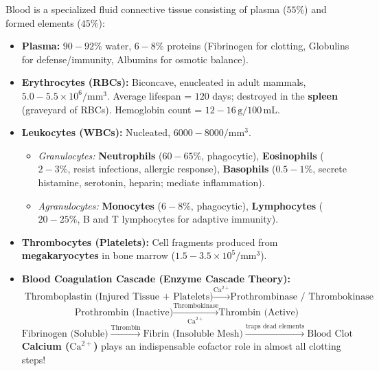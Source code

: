 \documentclass[10pt,a4paper]{article}
\begin{document}
\begin{conceptbox}
Blood is a specialized fluid connective tissue consisting of plasma ($55\%$) and formed elements ($45\%$):
\begin{itemize}
  \item \textbf{Plasma:} $90-92\%$ water, $6-8\%$ proteins (Fibrinogen for clotting, Globulins for defense/immunity, Albumins for osmotic balance).
  \item \textbf{Erythrocytes (RBCs):} Biconcave, enucleated in adult mammals, $5.0-5.5 \times 10^6/\mathrm{mm}^3$. Average lifespan = $120$ days; destroyed in the \textbf{spleen} (graveyard of RBCs). Hemoglobin count = $12-16\,\mathrm{g}/100\,\mathrm{mL}$.
  \item \textbf{Leukocytes (WBCs):} Nucleated, $6000-8000/\mathrm{mm}^3$.
  \begin{itemize}
    \item \textit{Granulocytes:} \textbf{Neutrophils} ($60-65\%$, phagocytic), \textbf{Eosinophils} ($2-3\%$, resist infections, allergic response), \textbf{Basophils} ($0.5-1\%$, secrete histamine, serotonin, heparin; mediate inflammation).
    \item \textit{Agranulocytes:} \textbf{Monocytes} ($6-8\%$, phagocytic), \textbf{Lymphocytes} ($20-25\%$, B and T lymphocytes for adaptive immunity).
  \end{itemize}
  \item \textbf{Thrombocytes (Platelets):} Cell fragments produced from \textbf{megakaryocytes} in bone marrow ($1.5-3.5 \times 10^5/\mathrm{mm}^3$).
  \item \textbf{Blood Coagulation Cascade (Enzyme Cascade Theory):}
  \begin{equation}
    \text{Thromboplastin (Injured Tissue + Platelets)} \xrightarrow{\mathrm{Ca}^{2+}} \text{Prothrombinase / Thrombokinase}
  \end{equation}
  \begin{equation}
    \text{Prothrombin (Inactive)} \xrightarrow[\mathrm{Ca}^{2+}]{\text{Thrombokinase}} \text{Thrombin (Active)}
  \end{equation}
  \begin{equation}
    \text{Fibrinogen (Soluble)} \xrightarrow{\text{Thrombin}} \text{Fibrin (Insoluble Mesh)} \xrightarrow{\text{traps dead elements}} \text{Blood Clot}
  \end{equation}
  \textbf{Calcium ($\mathrm{Ca}^{2+}$)} plays an indispensable cofactor role in almost all clotting steps!
\end{itemize}
\end{conceptbox}
\end{document}
